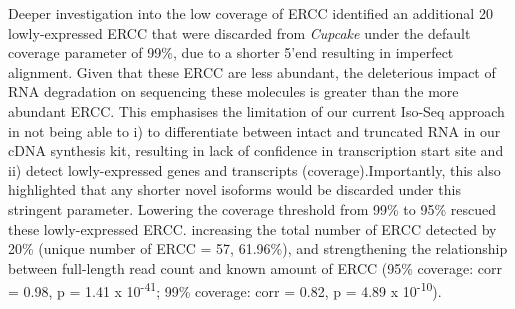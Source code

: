 Deeper investigation into the low coverage of ERCC identified an additional 20 lowly-expressed ERCC that were 
discarded from \textit{Cupcake} under the default coverage parameter of 99\%, due to a shorter 5'end resulting in imperfect alignment. Given that these ERCC are less abundant, the deleterious impact of RNA degradation on sequencing these molecules is greater than the more abundant ERCC. This emphasises the limitation of our current Iso-Seq approach in not being able to i) to differentiate between intact and truncated RNA in our cDNA synthesis kit, resulting in lack of confidence in transcription start site and ii) detect lowly-expressed genes and transcripts (coverage).Importantly, this also highlighted that any shorter novel isoforms would be discarded under this stringent parameter. Lowering the coverage threshold from 99\% to 95\% rescued these lowly-expressed ERCC. increasing the total number of ERCC detected by 20\% (unique number of ERCC = 57, 61.96\%), and strengthening the relationship between full-length read count and known amount of ERCC 
(95\% coverage: corr = 0.98, p = 1.41 x 10\textsuperscript{-41}; 99\% coverage: corr = 0.82, p = 4.89 x 10\textsuperscript{-10}).  

